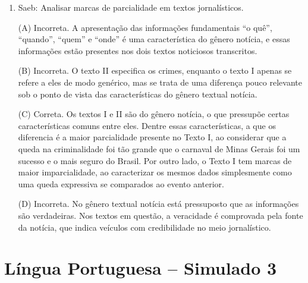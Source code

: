 \begin{enumerate}
(C) Correta. O artigo de opinião visa a avaliar uma situação relevante da
sociedade, apresentando argumentos que fundamentem a tese.

(D) Incorreta. A carta de reclamação tem destinatário certo, o que não
ocorre no texto em questão.

\item

Saeb: Analisar marcas de parcialidade em textos jornalísticos.

(A) Incorreta. A apresentação das informações fundamentais ``o quê'',
``quando'', ``quem'' e ``onde'' é uma característica do gênero notícia,
e essas informações estão presentes nos dois textos noticiosos
transcritos.

(B) Incorreta. O texto II especifica os crimes, enquanto o texto I
apenas se refere a eles de modo genérico, mas se trata de uma diferença
pouco relevante sob o ponto de vista das características do gênero
textual notícia.

(C) Correta. Os textos I e II são do gênero notícia, o que pressupõe
certas características comuns entre eles. Dentre essas características,
a que os diferencia é a maior parcialidade presente no Texto I, ao
considerar que a queda na criminalidade foi tão grande que o carnaval de
Minas Gerais foi um sucesso e o mais seguro do Brasil. Por outro lado, o
Texto I tem marcas de maior imparcialidade, ao caracterizar os mesmos
dados simplesmente como uma queda expressiva se comparados ao evento
anterior.

(D) Incorreta. No gênero textual notícia está pressuposto que as
informações são verdadeiras. Nos textos em questão, a veracidade é
comprovada pela fonte da notícia, que indica veículos com credibilidade
no meio jornalístico.

\end{enumerate}

\section*{Língua Portuguesa – Simulado 3}

